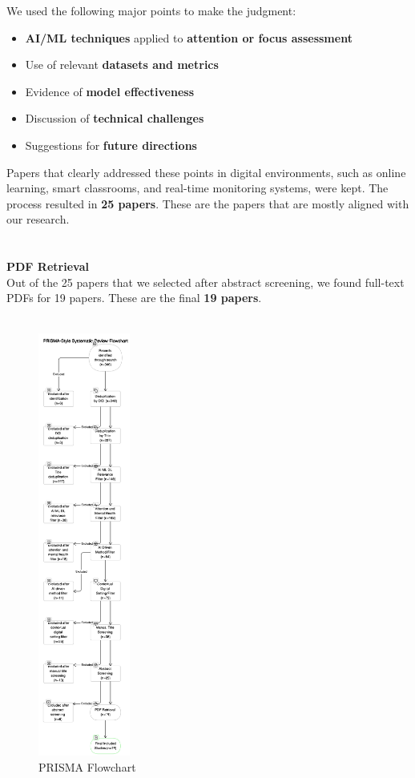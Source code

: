 \documentclass[twocolumn,12pt]{article}
\begin{document}
We used the following major points to make the judgment:
\begin{itemize}
    \item \textbf{AI/ML techniques} applied to \textbf{attention or focus assessment}
    \item Use of relevant \textbf{datasets and metrics}
    \item Evidence of \textbf{model effectiveness}
    \item Discussion of \textbf{technical challenges}
    \item Suggestions for \textbf{future directions}
\end{itemize}

Papers that clearly addressed these points in digital environments, such as online learning, smart classrooms, and real-time monitoring systems, were kept. The process resulted in \textbf{25 papers}. These are the papers that are mostly aligned with our research. \\ \\ \\
\textbf{PDF Retrieval} \\ 
Out of the 25 papers that we selected after abstract screening, we found full-text PDFs for 19 papers. These are the final \textbf{19 papers}.\\ \\

\vspace{1em}
\begin{figure}[H]
\centering
\hspace{2cm}
\includegraphics[width=0.27\textwidth]{Prisma.png}
\caption{PRISMA Flowchart}
\end{figure}
\end{document}
